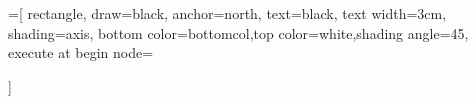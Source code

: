 \usepackage{varwidth}
\usepackage{pgf}

\usetikzlibrary{positioning, arrows, decorations.markings}
\usetikzlibrary{shapes}



\newcommand{\switch}[2]{
    \scalebox{#1}{
        \begin{tikzpicture}
            \node at (0,0) {\texttt{[image: switch.pdf]}};
            \node at (0,-0.6) {#2};
        \end{tikzpicture}
    }
}

=[
    rectangle,
    draw=black,
    anchor=north,
    text=black,
    text width=3cm,
    shading=axis,
    bottom color=bottomcol,top color=white,shading angle=45,
    execute at begin node={\begin{varwidth}{15em}},
    execute at end node={\end{varwidth}}
]

\usepackage{pgfplots}


\newenvironment{customlegend}[1][]{%
    \begingroup
    \csname pgfplots@init@cleared@structures\endcsname
    \pgfplotsset{#1}%
}{%
    \csname pgfplots@createlegend\endcsname
    \endgroup
}%

\def\addlegendimage{\csname pgfplots@addlegendimage\endcsname}
